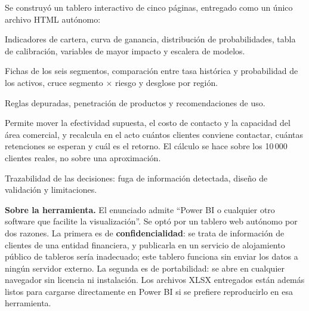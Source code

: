 \documentclass[11pt,a4paper]{article}
\begin{document}
Se construyó un tablero interactivo de cinco páginas, entregado como un único
archivo HTML autónomo:

\begin{center}
\end{center}

\begin{description}[leftmargin=1.4em,style=nextline,nosep]
\item[Página 1 --- Predicción de fuga] Indicadores de cartera, curva de ganancia,
      distribución de probabilidades, tabla de calibración, variables de mayor
      impacto y escalera de modelos.
\item[Página 2 --- Segmentación] Fichas de los seis segmentos, comparación entre
      tasa histórica y probabilidad de los activos, cruce segmento $\times$ riesgo
      y desglose por región.
\item[Página 3 --- Canastas Bakery] Reglas depuradas, penetración de productos y
      recomendaciones de uso.
\item[Página 4 --- Simulador de campaña] Permite mover la efectividad supuesta, el
      costo de contacto y la capacidad del área comercial, y recalcula en el acto
      cuántos clientes conviene contactar, cuántas retenciones se esperan y cuál
      es el retorno. El cálculo se hace sobre los 10\,000 clientes reales, no
      sobre una aproximación.
\item[Página 5 --- Metodología] Trazabilidad de las decisiones: fuga de
      información detectada, diseño de validación y limitaciones.
\end{description}

\begin{nota}
\small \textbf{Sobre la herramienta.} El enunciado admite ``Power BI o cualquier
otro software que facilite la visualización''. Se optó por un tablero web
autónomo por dos razones. La primera es de \textbf{confidencialidad}: se trata de
información de clientes de una entidad financiera, y publicarla en un servicio de
alojamiento público de tableros sería inadecuado; este tablero funciona sin
enviar los datos a ningún servidor externo. La segunda es de portabilidad: se
abre en cualquier navegador sin licencia ni instalación. Los archivos XLSX
entregados están además listos para cargarse directamente en Power BI si se
prefiere reproducirlo en esa herramienta.
\end{nota}
\end{document}
